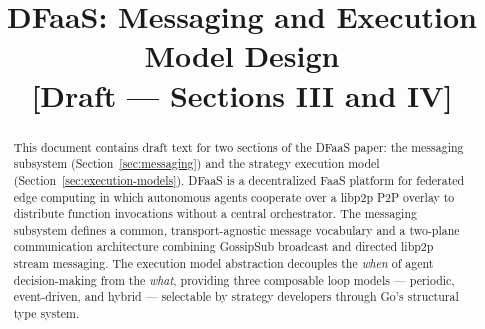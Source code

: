 \documentclass[conference]{IEEEtran}
\begin{document}
\title{%
  DFaaS: Messaging and Execution Model Design\\
  {\large [Draft --- Sections III and IV]}%
}

\author{%
}

\maketitle

\begin{abstract}
  This document contains draft text for two sections of the \ac{DFaaS} paper:
  the messaging subsystem (Section~\ref{sec:messaging}) and the strategy
  execution model (Section~\ref{sec:execution-models}).
  \ac{DFaaS} is a decentralized \ac{FaaS} platform for federated edge computing
  in which autonomous agents cooperate over a libp2p \ac{P2P} overlay to
  distribute function invocations without a central orchestrator.
  The messaging subsystem defines a common, transport-agnostic message
  vocabulary and a two-plane communication architecture combining
  \ac{GossipSub} broadcast and directed libp2p stream messaging.
  The execution model abstraction decouples the \emph{when} of agent
  decision-making from the \emph{what}, providing three composable loop
  models — periodic, event-driven, and hybrid — selectable by strategy
  developers through Go's structural type system.
\end{abstract}








\end{document}
